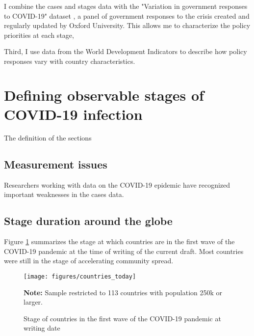 \documentclass[12pt,english]{article}
\begin{document}
I combine the cases and stages data with the "Variation in government responses to COVID-19" dataset  \citep{Hale2020}, a panel of government responses to the crisis created and regularly updated by Oxford University.  This allows me to characterize the policy priorities at each stage,

Third, I use data from the World Development Indicators \citep{WorldBank2020} to describe how policy responses vary with country characteristics.




\section{Defining observable stages of COVID-19 infection\label{sec:Stages}}

The definition of the sections

\subsection{Measurement issues}

Researchers working with data on the COVID-19 epidemic have recognized important weaknesses in the cases data.

\subsection{Stage duration around the globe}

Figure \ref{fig:current_stage} summarizes the stage at which countries are in the first wave of the COVID-19 pandemic at the time of writing of the current draft. Most countries were still in the stage of accelerating community spread.


\begin{figure}[H]
	\singlespacing
	\centering
	 \caption{Stage of countries in the first wave of the COVID-19 pandemic at writing date}  \label{fig:current_stage}
	\resizebox{0.8\width}{!} {
		\begin{threeparttable}

 			  \texttt{[image: figures/countries\_today]}
  			 \begin{tablenotes}[flushleft]\vspace*{-7bp}
			\item \textbf{Note:} Sample restricted to 113 countries with population 250k or larger.
			 \end{tablenotes}
  		\end{threeparttable}
 		}
  	 \onehalfspacing
\end{figure}
\end{document}
